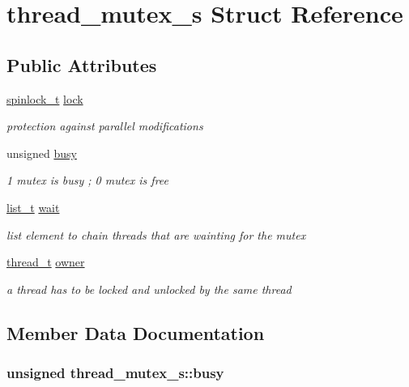 \hypertarget{structthread__mutex__s}{\section{thread\-\_\-mutex\-\_\-s Struct Reference}
\label{structthread__mutex__s}
}
\subsection*{Public Attributes}
\begin{DoxyCompactItemize}
\item 
\hyperlink{atomic_8h_ac96e125536af227ccca8875138c83e42}{spinlock\-\_\-t} \hyperlink{structthread__mutex__s_a541c29b3f7adb7366d0fa924fe212045}{lock}
\begin{DoxyCompactList}\small\item\em protection against parallel modifications \end{DoxyCompactList}\item 
unsigned \hyperlink{structthread__mutex__s_a8755c9b956e9b431348fe2a47957246d}{busy}
\begin{DoxyCompactList}\small\item\em 1 mutex is busy ; 0 mutex is free \end{DoxyCompactList}\item 
\hyperlink{list_8h_ad3b2684139c847cd572cb7b9679ce227}{list\-\_\-t} \hyperlink{structthread__mutex__s_ad48ae2f605a85e11fa31e11c78cb726c}{wait}
\begin{DoxyCompactList}\small\item\em list element to chain threads that are wainting for the mutex \end{DoxyCompactList}\item 
\hyperlink{kthread_8h_a755fbb4a945decf90cb1c0eb5fd16878}{thread\-\_\-t} \hyperlink{structthread__mutex__s_aebfefcc73771f614b7f19296a46e2b04}{owner}
\begin{DoxyCompactList}\small\item\em a thread has to be locked and unlocked by the same thread \end{DoxyCompactList}\end{DoxyCompactItemize}


\subsection{Member Data Documentation}
\hypertarget{structthread__mutex__s_a8755c9b956e9b431348fe2a47957246d}{
\subsubsection[{busy}]{\setlength{\rightskip}{0pt plus 5cm}unsigned thread\-\_\-mutex\-\_\-s\-::busy}}\label{structthread__mutex__s_a8755c9b956e9b431348fe2a47957246d}


